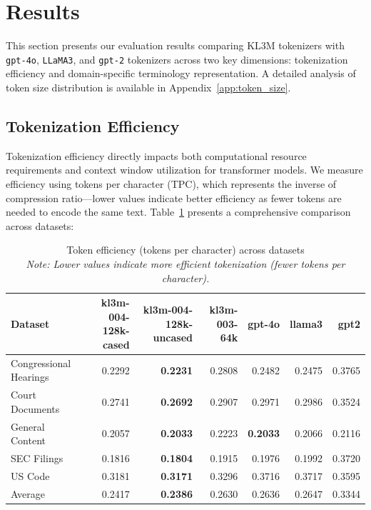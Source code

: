 \section{Results}
\label{sec:results}

This section presents our evaluation results comparing KL3M tokenizers with \texttt{gpt-4o}, \texttt{LLaMA3}, and \texttt{gpt-2} tokenizers across two key dimensions: tokenization efficiency and domain-specific terminology representation. A detailed analysis of token size distribution is available in Appendix~\ref{app:token_size}.

\subsection{Tokenization Efficiency}

Tokenization efficiency directly impacts both computational resource requirements and context window utilization for transformer models. We measure efficiency using tokens per character (TPC), which represents the inverse of compression ratio—lower values indicate better efficiency as fewer tokens are needed to encode the same text. Table~\ref{tab:token-efficiency} presents a comprehensive comparison across datasets:

\begin{table}[ht]
\centering
\caption{Token efficiency (tokens per character) across datasets\\\small \textit{Note: Lower values indicate more efficient tokenization (fewer tokens per character).}}
\label{tab:token-efficiency}
\small
\begin{tabular}{lrrrrrr}
\toprule
Dataset & kl3m\mbox{-}004\mbox{-}128k\mbox{-}cased & kl3m\mbox{-}004\mbox{-}128k\mbox{-}uncased & kl3m\mbox{-}003\mbox{-}64k & gpt\mbox{-}4o & llama3 & gpt2 \\
\midrule
Congressional Hearings & 0.2292 & \textbf{0.2231} & 0.2808 & 0.2482 & 0.2475 & 0.3765 \\
Court Documents & 0.2741 & \textbf{0.2692} & 0.2907 & 0.2971 & 0.2986 & 0.3524 \\
General Content & 0.2057 & \textbf{0.2033} & 0.2223 & \textbf{0.2033} & 0.2066 & 0.2116 \\
SEC Filings & 0.1816 & \textbf{0.1804} & 0.1915 & 0.1976 & 0.1992 & 0.3720 \\
US Code & 0.3181 & \textbf{0.3171} & 0.3296 & 0.3716 & 0.3717 & 0.3595 \\
\midrule
Average & 0.2417 & \textbf{0.2386} & 0.2630 & 0.2636 & 0.2647 & 0.3344 \\
\bottomrule
\end{tabular}
\end{table}

